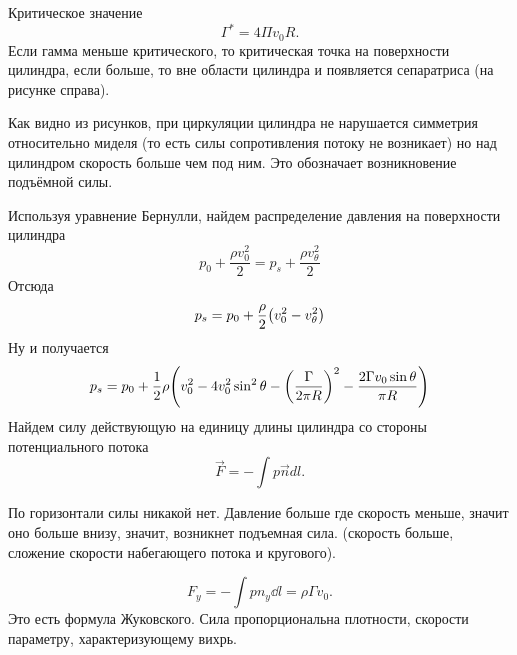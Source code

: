 Критическое значение
\begin{equation}
	\Gamma^*=4\Pi v_0 R.
\end{equation}
Если гамма меньше критического, то критическая точка на поверхности цилиндра, если больше, то вне области цилиндра и появляется сепаратриса (на рисунке справа).

Как видно из рисунков, при циркуляции цилиндра не нарушается
симметрия относительно миделя (то есть силы сопротивления потоку не
возникает) но над цилиндром  скорость больше чем под ним. Это обозначает возникновение подъёмной силы.

Используя уравнение Бернулли, найдем распределение давления на
поверхности цилиндра
\begin{equation}
	p_0+\frac{\rho v_0^2}{2}=p_s+\frac{\rho v_\theta^2}{2}
\end{equation}
Отсюда
\begin{equation}
	p_s=p_0+\frac{\rho}{2}\qty(v_0^2-v_\theta^2)
\end{equation}
Ну и получается
\begin{equation}
	p_s=p_0+\frac12\rho\qty(v_0^2-4v_0^2\sin^2\theta-\qty(\frac{\Gamma}{2\pi R})^2-\frac{2\Gamma v_0\sin\theta}{\pi R})
\end{equation}
Найдем силу действующую на единицу длины цилиндра со стороны
потенциального потока
\begin{equation}
	\vec{F}=-\int p\vec{n}dl.
\end{equation}

По горизонтали силы никакой нет. Давление больше где скорость меньше, значит оно больше внизу, значит, возникнет подъемная сила. (скорость больше, сложение скорости набегающего потока и кругового).

\begin{equation}
	F_y=-\int p n_y \dd{l}=\rho \Gamma v_0. 
\end{equation}
Это есть формула Жуковского. Сила пропорциональна плотности, скорости параметру, характеризующему вихрь.

%


